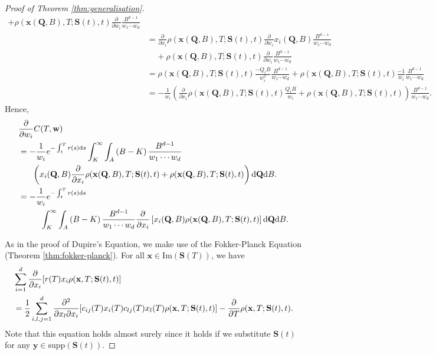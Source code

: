 \documentclass[english]{article}
\numberwithin{equation}{section}
\numberwithin{figure}{section}
\theoremstyle{bolddescit}
\theoremstyle{definition}
\theoremstyle{definition}
\theoremstyle{plain}
\theoremstyle{plain}
\theoremstyle{bolddesc}
\theoremstyle{plain}
\theoremstyle{remark}
\begin{document}
\begin{proof}[Proof of Theorem \ref{thm:generalisation}]
\begin{align*}
      + \rho(\mathbf{x}(\mathbf{Q},B),T;\mathbf{S}(t),t) \frac{\partial}{\partial w_i} \frac{B^{d-1}}{w_1 \cdots w_d}\\
    &= \frac{\partial}{\partial x_i} \rho(\mathbf{x}(\mathbf{Q},B),T;\mathbf{S}(t),t) \frac{\partial}{\partial w_i} x_i(\mathbf{Q},B) \frac{B^{d-1}}{w_1 \cdots w_d}\\
      &\ \ \ \ \ + \rho(\mathbf{x}(\mathbf{Q},B),T;\mathbf{S}(t),t) \frac{\partial}{\partial w_i} \frac{B^{d-1}}{w_1 \cdots w_d} \\
    &= \rho(\mathbf{x}(\mathbf{Q},B),T;\mathbf{S}(t),t) \frac{-Q_i B}{w_i^2} \frac{B^{d-1}}{w_1 \cdots w_d}
      + \rho(\mathbf{x}(\mathbf{Q},B),T;\mathbf{S}(t),t) \frac{-1}{w_i} \frac{B^{d-1}}{w_1 \cdots w_d}\\
    &= -\frac{1}{w_i} \left(\frac{\partial}{\partial x_i} \rho(\mathbf{x}(\mathbf{Q},B),T;\mathbf{S}(t),t) \frac{Q_i B}{w_i}
      + \rho(\mathbf{x}(\mathbf{Q},B),T;\mathbf{S}(t),t)\right) \frac{B^{d-1}}{w_1 \cdots w_d}.
  \end{align*}
  Hence,
  \begin{align}
    &\frac{\partial}{\partial w_i} C(T,\mathbf{w})\notag\\
    &= - \frac{1}{w_i}e^{-\int_t^T r(s) \mathrm{d}s}\int_K^\infty \int_A \left(B - K\right) \frac{B^{d-1}}{w_1 \cdots w_d}\notag\\
      &\ \ \ \ \ \left(x_i(\mathbf{Q},B)\frac{\partial}{\partial x_i} \rho(\mathbf{x}(\mathbf{Q},B),T;\mathbf{S}(t),t) + \rho(\mathbf{x}(\mathbf{Q},B),T;\mathbf{S}(t),t)\right) \mathrm{d}\mathbf{Q} \mathrm{d}B.\notag\\
    &= - \frac{1}{w_i}e^{-\int_t^T r(s) \mathrm{d}s}\notag\\
    &\ \ \ \ \ \ \ \ \int_K^\infty \int_A \left(B - K\right) \frac{B^{d-1}}{w_1 \cdots w_d}
        \frac{\partial}{\partial x_i}\left[x_i(\mathbf{Q},B) \rho(\mathbf{x}(\mathbf{Q},B),T;\mathbf{S}(t),t) \right] \mathrm{d}\mathbf{Q} \mathrm{d}B.\label{eq:generalisation-dC-dw}
  \end{align}

  As in the proof of Dupire's Equation, we make use of the Fokker-Planck Equation (Theorem \ref{thm:fokker-planck}). For all $\mathbf{x} \in \mathrm{Im}(\mathbf{S}(T))$, we have
  \begin{align}
    &\sum_{i=1}^d \frac{\partial}{\partial x_i}[r(T) x_i \rho(\mathbf{x},T;\mathbf{S}(t),t)]\notag\\
      &= \frac{1}{2} \sum_{i,l,j=1}^{d} \frac{\partial^2}{\partial x_l \partial x_i}[c_{ij}(T) x_i(T) c_{lj}(T) x_l(T) \rho(\mathbf{x},T;\mathbf{S}(t),t)]
        -\frac{\partial}{\partial T}\rho(\mathbf{x},T;\mathbf{S}(t),t).\label{eq:generalisation-fokker-planck}
  \end{align}
  Note that this equation holds almost surely since it holds if we substitute $\mathbf{S}(t)$ for any $\mathbf{y} \in \mathrm{supp}(\mathbf{S}(t))$.


\end{proof}
\end{document}
